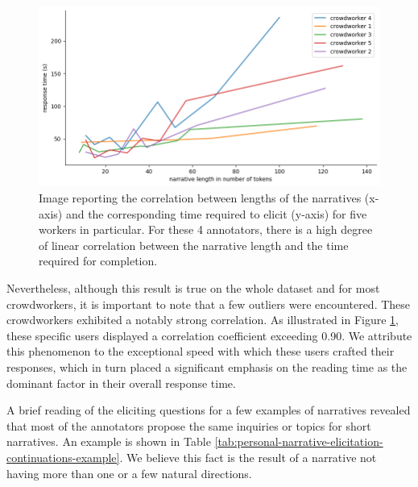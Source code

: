 \begin{figure}[!htbp]
        \includegraphics[width=1\linewidth]{assets//imgs/dataset-high-correlation-workers.png}
        \caption{Image reporting the correlation between lengths of the narratives (x-axis) and the corresponding time required to elicit (y-axis) for five workers in particular. For these 4 annotators, there is a high degree of linear correlation between the narrative length and the time required for completion.}
        \label{fig:dataset-high-correlation-workers}
\end{figure}
Nevertheless, although this result is true on the whole dataset and for most crowdworkers, it is important to note that a few outliers were encountered. These crowdworkers exhibited a notably strong correlation. As illustrated in Figure \ref{fig:dataset-high-correlation-workers}, these specific users displayed a correlation coefficient exceeding 0.90. We attribute this phenomenon to the exceptional speed with which these users crafted their responses, which in turn placed a significant emphasis on the reading time as the dominant factor in their overall response time.


A brief reading of the eliciting questions for a few examples of narratives revealed that most of the annotators propose the same inquiries or topics for short narratives. An example is shown in Table \ref{tab:personal-narrative-elicitation-continuations-example}. We believe this fact is the result of a narrative not having more than one or a few natural directions.%
